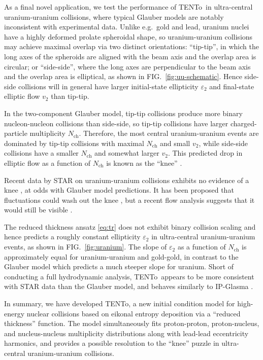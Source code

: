 \documentclass[aps,prc,reprint,amsmath,nofootinbib]{revtex4-1}
\newcommand{\psec}[1]{\phantomsection\addcontentsline{toc}{section}{#1}}
\newcommand{\trento}{T\raisebox{-.5ex}{R}ENTo}
\newcommand{\nch}{N_\text{ch}}
\begin{document}
As a final novel application, we test the performance of \trento\ in ultra-central uranium-uranium collisions, where typical Glauber models are notably inconsistent with experimental data.
Unlike e.g.~gold and lead, uranium nuclei have a highly deformed prolate spheroidal shape, so uranium-uranium collisions may achieve maximal overlap via two distinct orientations:
``tip-tip'', in which the long axes of the spheroids are aligned with the beam axis and the overlap area is circular;
or ``side-side'', where the long axes are perpendicular to the beam axis and the overlap area is elliptical, as shown in FIG.~\ref{fig:uu-schematic}.
Hence side-side collisions will in general have larger initial-state ellipticity $\varepsilon_2$ and final-state elliptic flow $v_2$ than tip-tip.

In the two-component Glauber model, tip-tip collisions produce more binary nucleon-nucleon collisions than side-side, so tip-tip collisions have larger charged-particle multiplicity $\nch$.
Therefore, the most central uranium-uranium events are dominated by tip-tip collisions with maximal $\nch$ and small $v_2$, while side-side collisions have a smaller $\nch$ and somewhat larger $v_2$.
This predicted drop in elliptic flow as a function of $\nch$ is known as the ``knee'' \cite{Voloshin:2010ut}.

Recent data by STAR on uranium-uranium collisions exhibits no evidence of a knee \cite{FortheSTAR:2013bza,Wang:2014qxa}, at odds with Glauber model predictions.
It has been proposed that fluctuations could wash out the knee \cite{Rybczynski:2012av}, but a recent flow analysis suggests that it would still be visible \cite{osu}.

The reduced thickness ansatz \eqref{eq:tr} does not exhibit binary collision scaling and hence predicts a roughly constant ellipticity $\varepsilon_2$ in ultra-central uranium-uranium events, as shown in FIG.~\ref{fig:uranium}.
The slope of $\varepsilon_2$ as a function of $\nch$ is approximately equal for uranium-uranium and gold-gold, in contrast to the Glauber model which predicts a much steeper slope for uranium.
Short of conducting a full hydrodynamic analysis, \trento\ appears to be more consistent with STAR data than the Glauber model, and behaves similarly to IP-Glasma \cite{Wang:2014qxa}.

\psec{Conclusion}

In summary, we have developed \trento, a new initial condition model for high-energy nuclear collisions based on eikonal entropy deposition via a ``reduced thickness'' function.
The model simultaneously fits proton-proton, proton-nucleus, and nucleus-nucleus multiplicity distributions along with lead-lead eccentricity harmonics, and provides a possible resolution to the ``knee'' puzzle in ultra-central uranium-uranium collisions.
\end{document}
